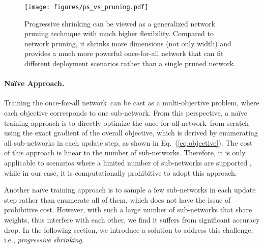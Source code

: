 \documentclass{article} \usepackage{iclr2020_conference,times}
\newcommand{\myparagraph}[1]{\vspace{-3pt}\paragraph{#1}}
\newcommand{\motherNet}{once-for-all network}
\begin{document}
\begin{figure}[t]
\vspace{-10pt}
    \centering
    \texttt{[image: figures/ps\_vs\_pruning.pdf]}
    \caption{Progressive shrinking can be viewed as a generalized network pruning technique with much higher flexibility. Compared to network pruning, it shrinks more dimensions (not only width) and provides a much more powerful once-for-all network that can fit different deployment scenarios rather than a single pruned network.}\label{fig:ps_vs_pruning}
\end{figure}

\myparagraph{Na\"{i}ve Approach.} Training the \motherNet~can be cast as a multi-objective problem, where each objective corresponds to one sub-network. From this perspective, a na\"{i}ve training approach is to directly optimize the  \motherNet~from scratch using the exact gradient of the overall objective, which is derived by enumerating all sub-networks in each update step, as shown in Eq.~(\ref{eq:objective}). The cost of this approach is linear to the number of sub-networks. Therefore, it is only applicable to scenarios where a limited number of sub-networks are supported \citep{yu2018slimmable}, while in our case, it is computationally prohibitive to adopt this approach. 

Another na\"{i}ve training approach is to sample a few sub-networks in each update step rather than enumerate all of them, which does not have the issue of prohibitive cost. However, with such a large number of sub-networks that share weights, thus interfere with each other, we find it suffers from significant accuracy drop. In the following section, we introduce a solution to address this challenge, i.e., \emph{progressive shrinking}. 
\end{document}
